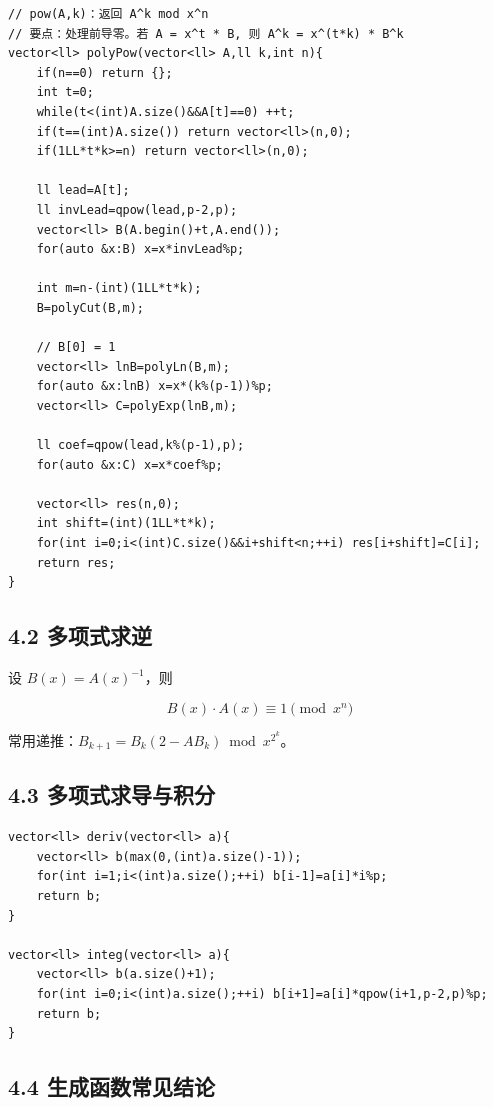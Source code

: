 \documentclass[UTF8,a4paper,11pt]{ctexart}
\begin{document}
\begin{Verbatim}[fontsize=\small,frame=single,breaklines=true,breakanywhere=true]
// pow(A,k)：返回 A^k mod x^n
// 要点：处理前导零。若 A = x^t * B, 则 A^k = x^(t*k) * B^k
vector<ll> polyPow(vector<ll> A,ll k,int n){
    if(n==0) return {};
    int t=0;
    while(t<(int)A.size()&&A[t]==0) ++t;
    if(t==(int)A.size()) return vector<ll>(n,0);
    if(1LL*t*k>=n) return vector<ll>(n,0);

    ll lead=A[t];
    ll invLead=qpow(lead,p-2,p);
    vector<ll> B(A.begin()+t,A.end());
    for(auto &x:B) x=x*invLead%p;

    int m=n-(int)(1LL*t*k);
    B=polyCut(B,m);

    // B[0] = 1
    vector<ll> lnB=polyLn(B,m);
    for(auto &x:lnB) x=x*(k%(p-1))%p;
    vector<ll> C=polyExp(lnB,m);

    ll coef=qpow(lead,k%(p-1),p);
    for(auto &x:C) x=x*coef%p;

    vector<ll> res(n,0);
    int shift=(int)(1LL*t*k);
    for(int i=0;i<(int)C.size()&&i+shift<n;++i) res[i+shift]=C[i];
    return res;
}
\end{Verbatim}

\subsection*{4.2 多项式求逆}

设 $B(x)=A(x)^{-1}$，则

\[
B(x)\cdot A(x)\equiv 1\pmod{x^n}
\]

常用递推：$B_{k+1}=B_k(2-A B_k)\bmod x^{2^k}$。

\subsection*{4.3 多项式求导与积分}

\begin{Verbatim}[fontsize=\small,frame=single,breaklines=true,breakanywhere=true]
vector<ll> deriv(vector<ll> a){
    vector<ll> b(max(0,(int)a.size()-1));
    for(int i=1;i<(int)a.size();++i) b[i-1]=a[i]*i%p;
    return b;
}

vector<ll> integ(vector<ll> a){
    vector<ll> b(a.size()+1);
    for(int i=0;i<(int)a.size();++i) b[i+1]=a[i]*qpow(i+1,p-2,p)%p;
    return b;
}
\end{Verbatim}

\subsection*{4.4 生成函数常见结论}
\end{document}
